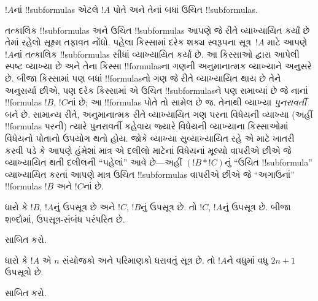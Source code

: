 \documentclass[../../../include/open-logic-section]{subfiles}
\begin{document}
\begin{defn}[!!^{subformula}]
$!A$નાં !!{subformula}s એટલે $!A$ પોતે અને તેનાં બધાં ઉચિત
!!{subformula}s.
\end{defn}

\begin{explain}
તત્કાલિક !!{subformula}s અને ઉચિત !!{subformula}s આપણે જે રીતે
વ્યાખ્યાયિત કર્યાં છે તેમાં રહેલો સૂક્ષ્મ તફાવત નોંધો. પહેલા કિસ્સામાં
દરેક શક્ય સ્વરૂપના સૂત્ર~$!A$ માટે આપણે $!A$નાં તત્કાલિક
!!{subformula}s સીધાં વ્યાખ્યાયિત કર્યાં છે. આ કિસ્સાઓ દ્વારા આપેલી સ્પષ્ટ વ્યાખ્યા
છે અને તેના કિસ્સા !!{formula}sના ગણની અનુમાનાત્મક વ્યાખ્યાને અનુસરે
છે. બીજા કિસ્સામાં પણ બધાં !!{formula}sનો ગણ જે રીતે વ્યાખ્યાયિત થાય
છે તેને અનુસર્યા છીએ, પણ દરેક કિસ્સામાં એ ઉચિત !!{subformula}sને પણ
સમાવ્યાં છે જે નાનાં !!{formula}s $!B$, $!C$નાં છે; આ !!{formula}s
પોતે તો સામેલ છે જ. તેનાથી
વ્યાખ્યા \emph{પુનરાવર્તી} બને છે. સામાન્ય રીતે, અનુમાનાત્મક રીતે
વ્યાખ્યાયિત ગણ પરના વિધેયની વ્યાખ્યા (અહીં !!{formula}s પરની)
ત્યારે પુનરાવર્તી કહેવાય જ્યારે વિધેયની વ્યાખ્યાના કિસ્સાઓમાં વિધેયનો
પોતાનો ઉપયોગ થતો હોય. જોકે વ્યાખ્યા સુવ્યાખ્યાયિત રહે એ માટે ખાતરી
કરવી પડે કે આપણે હંમેશાં માત્ર એ દલીલો માટેનાં વિધેયનાં મૂલ્યો વાપરીએ
છીએ જે વ્યાખ્યાયિત થતી દલીલની ``પહેલાં'' આવે છે---અહીં
$(!B\ast !C)$નું ``ઉચિત !!{subformula}'' વ્યાખ્યાયિત કરતાં આપણે માત્ર
ઉચિત !!{subformula}s વાપરીએ છીએ જે ``અગાઉનાં'' !!{formula}s $!B$ અને
$!C$નાં છે.
\end{explain}

\begin{prop}
ધારો કે $!B$, $!A$નું ઉપસૂત્ર છે અને $!C$, $!B$નું ઉપસૂત્ર છે. તો
$!C$, $!A$નું ઉપસૂત્ર છે. બીજા શબ્દોમાં, ઉપસૂત્ર-સંબંધ પરંપરિત છે.
\end{prop}

\begin{prob}
 સાબિત કરો.
\end{prob}

\begin{prop}
ધારો કે $!A$ એ $n$ સંયોજકો અને પરિમાણકો ધરાવતું સૂત્ર છે. તો $!A$ને
વધુમાં વધુ $2n+1$ ઉપસૂત્રો છે.
\end{prop}

\begin{prob}
 સાબિત કરો.
\end{prob}
\end{document}
